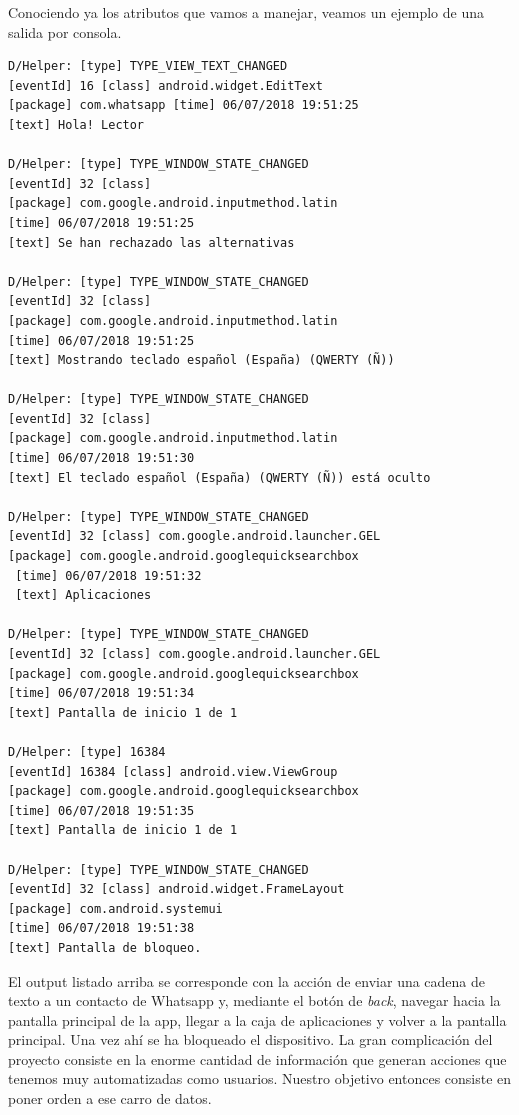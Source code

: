 \documentclass[12pt,a4paper,oneside]{book} %
\begin{document}
Conociendo ya los atributos que vamos a manejar, veamos un ejemplo de una salida por consola. 
\begin{verbatim}
D/Helper: [type] TYPE_VIEW_TEXT_CHANGED 
[eventId] 16 [class] android.widget.EditText 
[package] com.whatsapp [time] 06/07/2018 19:51:25 
[text] Hola! Lector

D/Helper: [type] TYPE_WINDOW_STATE_CHANGED 
[eventId] 32 [class]  
[package] com.google.android.inputmethod.latin 
[time] 06/07/2018 19:51:25 
[text] Se han rechazado las alternativas

D/Helper: [type] TYPE_WINDOW_STATE_CHANGED 
[eventId] 32 [class]  
[package] com.google.android.inputmethod.latin 
[time] 06/07/2018 19:51:25 
[text] Mostrando teclado español (España) (QWERTY (Ñ))

D/Helper: [type] TYPE_WINDOW_STATE_CHANGED 
[eventId] 32 [class]
[package] com.google.android.inputmethod.latin 
[time] 06/07/2018 19:51:30 
[text] El teclado español (España) (QWERTY (Ñ)) está oculto

D/Helper: [type] TYPE_WINDOW_STATE_CHANGED 
[eventId] 32 [class] com.google.android.launcher.GEL 
[package] com.google.android.googlequicksearchbox 
 [time] 06/07/2018 19:51:32 
 [text] Aplicaciones
 
D/Helper: [type] TYPE_WINDOW_STATE_CHANGED 
[eventId] 32 [class] com.google.android.launcher.GEL 
[package] com.google.android.googlequicksearchbox 
[time] 06/07/2018 19:51:34 
[text] Pantalla de inicio 1 de 1

D/Helper: [type] 16384 
[eventId] 16384 [class] android.view.ViewGroup 
[package] com.google.android.googlequicksearchbox 
[time] 06/07/2018 19:51:35
[text] Pantalla de inicio 1 de 1

D/Helper: [type] TYPE_WINDOW_STATE_CHANGED 
[eventId] 32 [class] android.widget.FrameLayout 
[package] com.android.systemui 
[time] 06/07/2018 19:51:38 
[text] Pantalla de bloqueo.
\end{verbatim}
El output listado arriba se corresponde con la acción de enviar una cadena de texto a un contacto de Whatsapp y, mediante el botón de \textit{back}, navegar hacia la pantalla principal de la app, llegar a la caja de aplicaciones y volver a la pantalla principal. Una vez ahí se ha bloqueado el dispositivo. 
\newline \newline 
La gran complicación del proyecto consiste en la enorme cantidad de información que generan acciones que tenemos muy automatizadas como usuarios. Nuestro objetivo entonces consiste en poner orden a ese carro de datos. 
\end{document}
